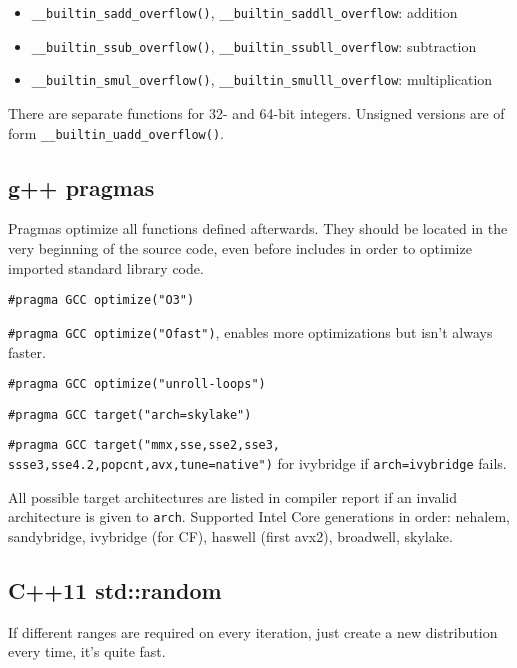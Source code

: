\documentclass{article}
\begin{document}
\begin{itemize}
	\item \verb|__builtin_sadd_overflow()|, \linebreak \verb|__builtin_saddll_overflow|: addition
	\item \verb|__builtin_ssub_overflow()|, \linebreak \verb|__builtin_ssubll_overflow|: subtraction
	\item \verb|__builtin_smul_overflow()|, \linebreak \verb|__builtin_smulll_overflow|: multiplication
\end{itemize}

There are separate functions for 32- and 64-bit integers. Unsigned versions are of form \verb|__builtin_uadd_overflow()|.

\subsection {g++ pragmas}

Pragmas optimize all functions defined afterwards. They should be located in the very beginning of the source code, even before includes in order to optimize imported standard library code.

\texttt{\#pragma GCC optimize("O3")}

\texttt{\#pragma GCC optimize("Ofast")}, enables more optimizations but isn't always faster.

\texttt{\#pragma GCC optimize("unroll-loops")}

\texttt{\#pragma GCC target("arch=skylake")}

\texttt{\#pragma GCC target("mmx,sse,sse2,sse3,\\ssse3,sse4.2,popcnt,avx,tune=native")} for ivybridge if \texttt{arch=ivybridge} fails.

All possible target architectures are listed in compiler report if an invalid architecture is given to \texttt{arch}. Supported Intel Core generations in order: nehalem, sandybridge, ivybridge (for CF), haswell (first avx2), broadwell, skylake.

\subsection {C++11 std::random}

If different ranges are required on every iteration, just create a new distribution every time, it's quite fast.


\end{document}
